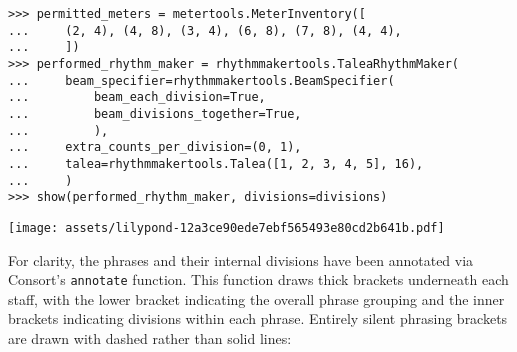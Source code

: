 \begin{comment}
<abjad>
permitted_meters = metertools.MeterInventory([
    (2, 4), (4, 8), (3, 4), (6, 8), (7, 8), (4, 4),
    ])
performed_rhythm_maker = rhythmmakertools.TaleaRhythmMaker(
    beam_specifier=rhythmmakertools.BeamSpecifier(
        beam_each_division=True,
        beam_divisions_together=True,
        ),
    extra_counts_per_division=(0, 1),
    talea=rhythmmakertools.Talea([1, 2, 3, 4, 5], 16),
    )
show(performed_rhythm_maker, divisions=divisions)
</abjad>
\end{comment}

\begin{abjadbookoutput}
\begin{singlespacing}
\vspace{-0.5\baselineskip}
\begin{lstlisting}
>>> permitted_meters = metertools.MeterInventory([
...     (2, 4), (4, 8), (3, 4), (6, 8), (7, 8), (4, 4),
...     ])
>>> performed_rhythm_maker = rhythmmakertools.TaleaRhythmMaker(
...     beam_specifier=rhythmmakertools.BeamSpecifier(
...         beam_each_division=True,
...         beam_divisions_together=True,
...         ),
...     extra_counts_per_division=(0, 1),
...     talea=rhythmmakertools.Talea([1, 2, 3, 4, 5], 16),
...     )
>>> show(performed_rhythm_maker, divisions=divisions)
\end{lstlisting}
\noindent\texttt{[image: assets/lilypond-12a3ce90ede7ebf565493e80cd2b641b.pdf]}
\end{singlespacing}
\end{abjadbookoutput}

\noindent For clarity, the phrases and their internal divisions have been
annotated via Consort's \texttt{annotate} function. This function draws thick
brackets underneath each staff, with the lower bracket indicating the overall
phrase grouping and the inner brackets indicating divisions within each phrase.
Entirely silent phrasing brackets are drawn with dashed rather than solid
lines:

\begin{comment}
<abjad>[stylesheet=../consort-small.ily]
score = build_score(
    performed_rhythm_maker=performed_rhythm_maker,
    permitted_meters=permitted_meters,
    score_template=score_template,
    timespan_inventory=timespan_inventory,
    )
consort.annotate(score)
show(score)
</abjad>
\end{comment}

